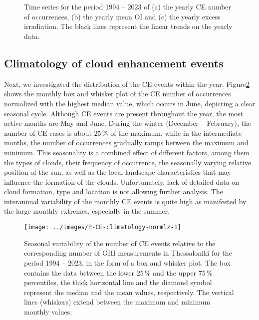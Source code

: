 \documentclass[preprint, 5p,
authoryear]{elsarticle} %
\begin{document}
\begin{figure}%
        {\centering 
            \\
            \\
        }
    \caption{Time series for the period 1994 -- 2023 of (a) the yearly CE number of occurrences, (b) the yearly mean OI and (c) the yearly excess irradiation. The black lines represent the linear trends on the yearly data.}\label{fig:P-energy}
\end{figure}

\hypertarget{climatology-of-cloud-enhancement-events}{%
\subsection{Climatology of cloud enhancement
events}\label{climatology-of-cloud-enhancement-events}}

Next, we investigated the distribution of the CE events within the year.
Figure\nobreakspace{}\ref{fig:relative-month-occurrences} shows the
monthly box and whisker plot of the CE number of occurrences normalized
with the highest median value, which occurs in June, depicting a clear
seasonal cycle. Although CE events are present throughout the year, the
most active months are May and June. During the winter (December --
February), the number of CE cases is about \(25\,\%\) of the maximum,
while in the intermediate months, the number of occurrences gradually
ramps between the maximum and minimum. This seasonality is a combined
effect of different factors, among them the types of clouds, their
frequency of occurrence, the seasonally varying relative position of the
sun, as well as the local landscape characteristics that may influence
the formation of the clouds. Unfortunately, lack of detailed data on
cloud formation, type and location is not allowing further analysis. The
interannual variability of the monthly CE events is quite high as
manifested by the large monthly extremes, especially in the summer.

\begin{figure}

{\centering \texttt{[image: ../images/P-CE-climatology-normlz-1]} 

}

\caption{Seasonal variability of the number of CE events relative to the corresponding number of GHI measurements in Thessaloniki for the period 1994 -- 2023, in the form of a box and whisker plot. The box contains the data between the lower $25\,\%$ and the upper $75\,\%$ percentiles, the thick horizontal line and the diamond symbol represent the median and the mean values, respectively. The vertical lines (whiskers) extend between the maximum and minimum monthly values.}\label{fig:relative-month-occurrences}
\end{figure}
\end{document}
